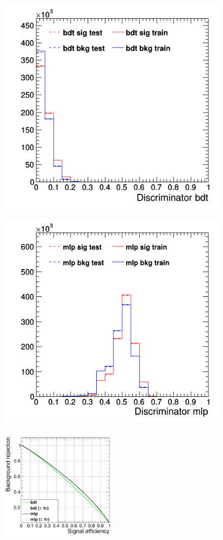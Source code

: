 \documentclass[11pt]{scrartcl}
\begin{document}
	\begin{figure}[H]
	\centering
	\begin{minipage}{.5\textwidth}
	  \centering
	  \includegraphics[width=0.75\linewidth]{figures/MVA/select1/config2/discriminator_bdt.png}
	  \label{fig:distr_s1_config2_bdt}
	\end{minipage}%
	\begin{minipage}{.5\textwidth}
	  \centering
	  \includegraphics[width=0.75\linewidth]{figures/MVA/select1/config2/discriminator_mlp.png}
	  \label{fig:distr_s1_config2_mlp}
	\end{minipage}
	\centering
	\includegraphics[width=0.5\textwidth]{figures/MVA/select1/config2/FOM_selection1_nL7_nT800_mD3_nC20.png}

\end{figure}
\end{document}
